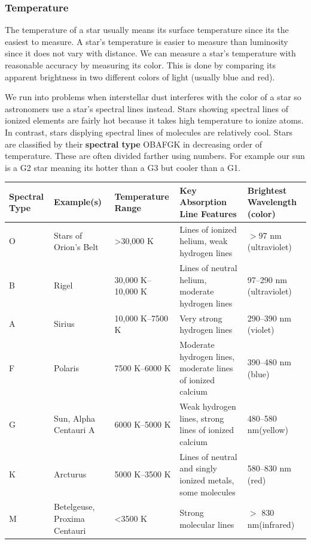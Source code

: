 \documentclass[12pt]{article}
\begin{document}
\subsubsection{Temperature}
The temperature of a star usually means its surface temperature since its the easiest to measure. A star's temperature is easier to measure than luminosity since it does not vary with distance. We can measure a star's temperature with reasonable accuracy by measuring its color. This is done by comparing its apparent brightness in two different colors of light (usually blue and red).

We run into problems when interstellar dust interferes with the color of a star so astronomers use a star's spectral lines instead. Stars showing spectral lines of ionized elements are fairly hot because it takes high temperature to ionize atoms. In contrast, stars displying spectral lines of molecules are relatively cool. Stars are classified by their \textbf{spectral type} OBAFGK in decreasing order of temperature. These are often divided farther using numbers. For example our sun is a G2 star meaning its hotter than a G3 but cooler than a G1.

\begin{tabular}{|l|l|l|l|l|}
Spectral Type & Example(s) & Temperature Range & Key Absorption Line Features & Brightest Wavelength (color) \\
\hline
O & Stars of Orion’s Belt & >30,000 K & Lines of ionized helium, weak hydrogen lines & $>$97 nm (ultraviolet) \\
\hline
B & Rigel & 30,000 K–10,000 K & Lines of neutral helium, moderate hydrogen lines & 97–290 nm (ultraviolet) \\
\hline
A & Sirius & 10,000 K–7500 K & Very strong hydrogen lines & 290–390 nm (violet) \\
\hline
F & Polaris & 7500 K–6000 K & Moderate hydrogen lines, moderate lines of ionized calcium & 390–480 nm (blue) \\
\hline
G & Sun, Alpha Centauri A & 6000 K–5000 K & Weak hydrogen lines, strong lines of ionized calcium & 480–580 nm(yellow) \\
\hline
K & Arcturus & 5000 K–3500 K & Lines of neutral and singly ionized metals, some molecules & 580–830 nm (red) \\
\hline
M & Betelgeuse, Proxima Centauri & <3500 K & Strong molecular lines & $>$ 830 nm(infrared) \\
\hline
\end{tabular}
\end{document}
